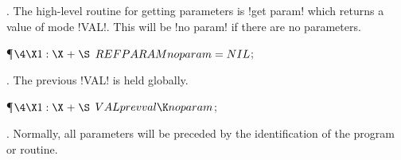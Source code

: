 . The high-level routine for getting parameters is !get param! which
returns a value of mode !VAL!. This will be !no param! if there are
no parameters.

\Y\P$\4\X1:\X\mathrel{+}\S$\6
$\\{REF}\\{PARAM}\\{no}\\{param}=\\{NIL}$;\par
\fi

. The previous !VAL! is held globally.

\Y\P$\4\X1:\X\mathrel{+}\S$\6
$\\{VAL}\\{prev}\\{val}\K\\{no}\\{param}$;\par
\fi

. Normally, all parameters will be preceded by the identification of
the program or routine.

